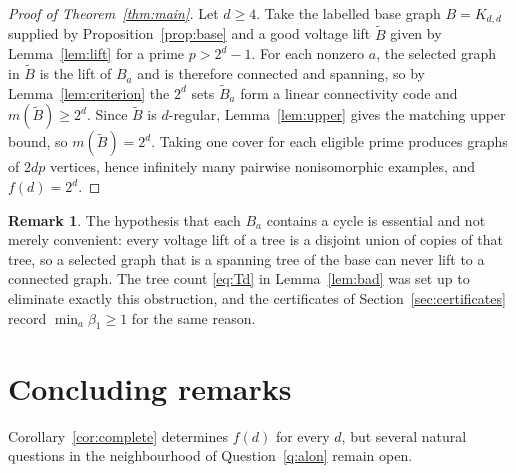 \documentclass[11pt,reqno]{amsart}
\theoremstyle{plain}
\theoremstyle{definition}
\newtheorem{remark}[theorem]{Remark}
\begin{document}
\begin{proof}[Proof of Theorem~\ref{thm:main}]
Let $d\ge 4$. Take the labelled base graph $B=K_{d,d}$ supplied by Proposition~\ref{prop:base} and a good voltage lift $\widetilde{B}$ given by Lemma~\ref{lem:lift} for a prime $p>2^{d}-1$. For each nonzero $a$, the selected graph in $\widetilde{B}$ is the lift of $B_{a}$ and is therefore connected and spanning, so by Lemma~\ref{lem:criterion} the $2^{d}$ sets $\widetilde{B}_{a}$ form a linear connectivity code and $m(\widetilde{B})\ge 2^{d}$. Since $\widetilde{B}$ is $d$-regular, Lemma~\ref{lem:upper} gives the matching upper bound, so $m(\widetilde{B})=2^{d}$. Taking one cover for each eligible prime produces graphs of $2dp$ vertices, hence infinitely many pairwise nonisomorphic examples, and $f(d)=2^{d}$.
\end{proof}

\begin{remark}
The hypothesis that each $B_{a}$ contains a cycle is essential and not merely convenient: every voltage lift of a tree is a disjoint union of copies of that tree, so a selected graph that is a spanning tree of the base can never lift to a connected graph. The tree count \eqref{eq:Td} in Lemma~\ref{lem:bad} was set up to eliminate exactly this obstruction, and the certificates of Section~\ref{sec:certificates} record $\min_{a}\beta_{1}\ge 1$ for the same reason.
\end{remark}

\section{Concluding remarks}\label{sec:concluding}

Corollary~\ref{cor:complete} determines $f(d)$ for every $d$, but several natural questions in the neighbourhood of Question~\ref{q:alon} remain open.
\end{document}

